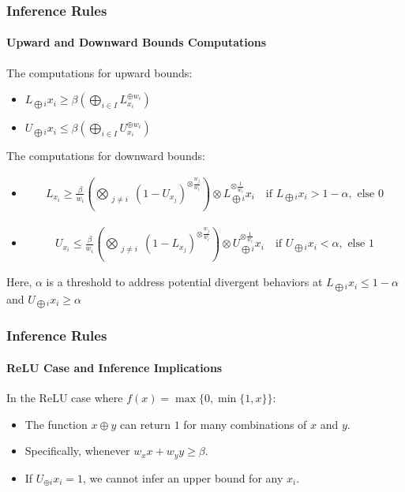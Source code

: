 \documentclass{beamer}
\begin{document}
\begin{frame}
\frametitle{Inference Rules}
\framesubtitle{Upward and Downward Bounds Computations}
The computations for upward bounds:
\begin{itemize}
\item $L_{\bigoplus i} x_i \geq \beta \left( \bigoplus_{i \in I}
    L^{\oplus w_i}_{x_i} \right)$
\item $U_{\bigoplus i} x_i \leq \beta \left( \bigoplus_{i \in I}
    U^{\oplus w_i}_{x_i} \right)$ 
\end{itemize}
The computations for downward bounds:
\begin{itemize}
\item \begin{align*}
L_{x_i} \geq \frac{\beta}{w_i} \left( \bigotimes_{\substack{j \neq i}} (1 - U_{x_j})^{\otimes \frac{w_j}{w_i}} \right) \otimes L^{\otimes \frac{1}{w_i}}_{\bigoplus i} x_i \quad \text{if } L_{\bigoplus i} x_i > 1 - \alpha, \text{ else } 0
\end{align*}
\item \begin{align*}
U_{x_i} \leq \frac{\beta}{w_i} \left( \bigotimes_{\substack{j \neq i}} (1 - L_{x_j})^{\otimes \frac{w_j}{w_i}} \right) \otimes U^{\otimes \frac{1}{w_i}}_{\bigoplus i} x_i \quad \text{if } U_{\bigoplus i} x_i < \alpha, \text{ else } 1
\end{align*}
\end{itemize}
Here, \(\alpha\) is a threshold to address potential divergent
behaviors at $L_{\bigoplus i} x_i \leq 1 - \alpha$ and $U_{\bigoplus
  i} x_i \geq \alpha$
\end{frame}

\begin{frame}
\frametitle{Inference Rules}
\framesubtitle{ReLU Case and Inference Implications}
In the ReLU case where \(f(x) = \max\{0, \min\{1, x\}\}\):
\begin{itemize}
    \item The function \(x \oplus y\) can return $1$ for many
      combinations of \(x\) and \(y\).
    \item Specifically, whenever \(w_x x + w_y y \geq \beta\).
    \item If \(U_{\oplus i} x_i = 1\), we cannot infer an upper bound
      for any \(x_i\).
\end{itemize}
\end{frame}
\end{document}
